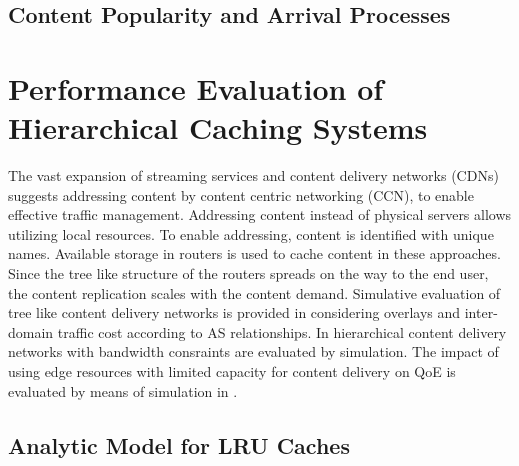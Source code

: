 \subsection{Content Popularity and Arrival Processes}

\section{Performance Evaluation of Hierarchical Caching Systems}
The vast expansion of streaming services and content delivery networks (CDNs) suggests addressing content by content centric networking (CCN), to enable effective traffic management.
Addressing content instead of physical servers allows utilizing local resources.
To enable addressing, content is identified with unique names.
Available storage in routers is used to cache content in these approaches.
Since the tree like structure of the routers spreads on the way to the end user, the content replication scales with the content demand.
Simulative evaluation of tree like content delivery networks is provided in \cite{lareida2015augmenting} considering overlays and inter-domain traffic cost according to AS relationships.
In \cite{applegate2010optimal} hierarchical content delivery networks with bandwidth consraints are evaluated by simulation. The impact of using edge resources with limited capacity for content delivery on QoE is evaluated by means of simulation in \cite{info3-inproceedings-2015-530}.

\subsection{Analytic Model for LRU Caches}

